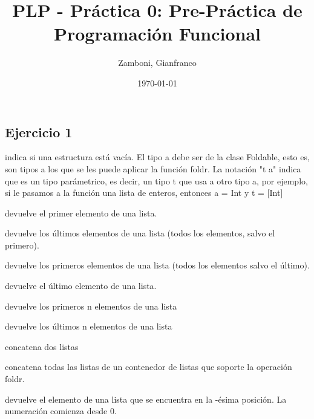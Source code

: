 \documentclass[10pt,a4paper]{article}
\begin{document}
\title{PLP - Práctica 0: Pre-Práctica de Programación Funcional}

\date{\today}

\author{Zamboni, Gianfranco}

\maketitle
\setcounter{page}{1}

\subsection{Ejercicio 1}
 indica si una estructura está vacía. El tipo a debe ser de la clase Foldable, esto es, son tipos a los que se les puede aplicar la función foldr. La notación "t a" indica que es un tipo parámetrico, es decir, un tipo t que usa a otro tipo a, por ejemplo, si le pasamos a la función una lista de enteros, entonces a = Int y t = [Int]

\vspace*{5mm}
 devuelve el primer elemento de una lista.

\vspace*{5mm}
 devuelve los últimos elementos de una lista (todos los elementos, salvo el primero).

\vspace*{5mm}
 devuelve los primeros elementos de una lista (todos los elementos salvo el último).

\vspace*{5mm}
 devuelve el último elemento de una lista.


\vspace*{5mm}
 devuelve los primeros n elementos de una lista

\vspace*{5mm}
 devuelve los últimos n elementos de una lista

\vspace*{5mm}
\haskell{(++) :: [a] -> [a] -> [a]} concatena dos listas

\vspace*{5mm}
 concatena todas las listas de un contenedor de listas que soporte la operación foldr.

\vspace*{5mm}
 devuelve el elemento de una lista 
 que se encuentra en la -ésima posición. La numeración comienza desde 0.
\end{document}
